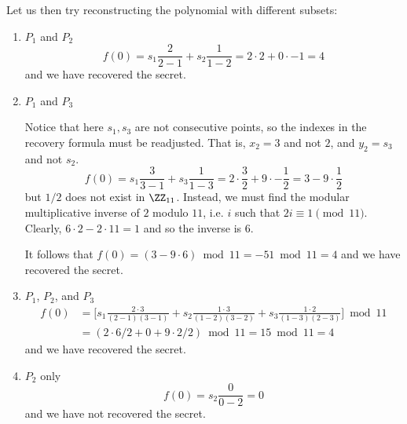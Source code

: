 \documentclass[parskip=half]{scrartcl}
\begin{document}
Let us then try reconstructing the polynomial with different subsets:
\begin{enumerate}
  \item $P_1$ and $P_2$
  \[
    f(0) = s_1 \frac{2}{2-1} + s_2 \frac{1}{1-2} =
    2 \cdot 2 + 0 \cdot -1 = 4
  \]
  and we have recovered the secret.

  \item $P_1$ and $P_3$
  
  Notice that here $s_1, s_3$ are not consecutive points, so the indexes in the recovery formula must be readjusted.
  That is, $x_2 = 3$ and not $2$, and $y_2 = s_3$ and not $s_2$.
  \[
    f(0) = s_1 \frac{3}{3-1} + s_3 \frac{1}{1-3} =
    2 \cdot \frac{3}{2} + 9 \cdot -\frac{1}{2} = 3 - 9 \cdot \frac{1}{2}
  \]
  but $1/2$ does not exist in $\ZZ_{11}$.
  Instead, we must find the modular multiplicative inverse of $2$ modulo $11$, i.e. $i$ such that $2i \equiv 1 \pmod{11}$.
  Clearly, $6 \cdot 2 - 2\cdot 11 = 1$ and so the inverse is $6$.

  It follows that
  $f(0) = (3 - 9\cdot 6) \bmod{11} = -51 \bmod{11} = 4$
  and we have recovered the secret.

  \item $P_1$, $P_2$, and $P_3$
  \begin{align*}
    f(0) &= \Biggl[s_1 \frac{2 \cdot 3}{(2-1)(3-1)} + s_2 \frac{1 \cdot 3}{(1-2)(3-2)} + s_3\frac{1 \cdot 2}{(1-3)(2-3)}\Biggr]\bmod{11}\\
    &= (2 \cdot 6/2 + 0 + 9 \cdot 2/2) \bmod{11} = 15 \bmod{11} = 4
  \end{align*}
  and we have recovered the secret.

  \item $P_2$ only
  \[
    f(0) = s_2 \frac{0}{0 - 2} = 0
  \]
  and we have not recovered the secret.
\end{enumerate}
\end{document}
